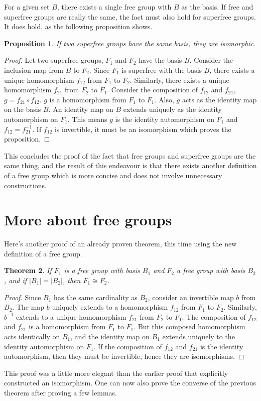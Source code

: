 \documentclass[12pt, titlepage]{article}
\newtheorem{thm}{Theorem}[section]
\newtheorem{prop}[thm]{Proposition}
\theoremstyle{definition}
\begin{document}
For a given set $B$, there exists a single free group with $B$ as the basis. If free and superfree groups are really the same, the fact must also hold for superfree groups. It does hold, as the following proposition shows.

\begin{prop}\label{univ}
If two superfree groups have the same basis, they are isomorphic.
\end{prop}

\begin{proof}
Let two superfree groups, $F_1$ and $F_2$ have the basis $B$. Consider the inclusion map from $B$ to $F_2$. Since $F_1$ is superfree with the basis $B$, there exists a unique homomorphism $f_{12}$ from $F_1$ to $F_2$. Similarly, there exists a unique homomorphism $f_{21}$ from $F_2$ to $F_1$. Consider the composition of $f_{12}$ and $f_{21}$, $g = f_{21} \circ f_{12}$. $g$ is a homomorphism from $F_1$ to $F_1$. Also, $g$ acts as the identity map on the basis $B$. An identity map on $B$ extends uniquely as the identity automorphism on $F_1$. This means $g$ is the identity automorphism on $F_1$ and $f_{12} = f_{21}^{-1}$. If $f_{12}$ is invertible, it must be an isomorphism which proves the proposition.
\end{proof}

This concludes the proof of the fact that free groups and superfree groups are the same thing, and the result of this endeavour is that there exists another definition of a free group which is more concise and does not involve unnecessary constructions.

\section{More about free groups}

Here's another proof of an already proven theorem, this time using the new definition of a free group.

\begin{thm}
If $F_1$ is a free group with basis $B_1$ and $F_2$ a free group with basis $B_2$, and if $|B_1|=|B_2|$, then $F_1 \cong F_2$.
\end{thm}

\begin{proof}
Since $B_1$ has the same cardinality as $B_2$, consider an invertible map $b$ from $B_2$. The map $b$ uniquely extends to a homomorphism $f_{12}$ from $F_1$ to $F_2$. Similarly, $b^{-1}$ extends to a unique homomorphism $f_{21}$ from $F_2$ to $F_1$. The composition of $f_{12}$ and $f_{21}$ is a homomorphism from $F_1$ to $F_1$. But this composed homomorphism acts identically on $B_1$, and the identity map on $B_1$ extends uniquely to the identity automorphism on $F_1$. If the composition of $f_{12}$ and $f_{21}$ is the identity automorphism, then they must be invertible, hence they are isomorphisms.
\end{proof}
This proof was a little more elegant than the earlier proof that explicitly constructed an isomorphism.
One can now also prove the converse of the previous theorem after proving a few lemmas.
\end{document}
